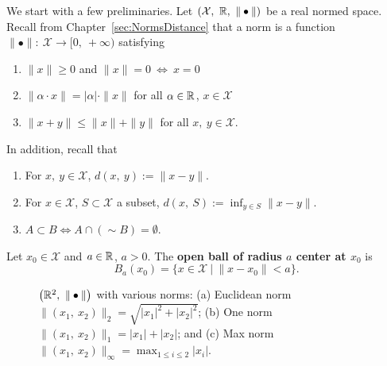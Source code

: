 We start with a few preliminaries. Let $(\mathcal{X},\ \mathbb R,\ \|\bullet\|)$ be a real normed space. Recall from Chapter~\ref{sec:NormsDistance} that a norm is a function $\|\bullet\|:\ \mathcal{X}\to[0,\ +\infty)$ satisfying
    \begin{enumerate}
       \renewcommand{\labelenumi}{(\alph{enumi})}
        \setlength{\itemsep}{.1cm}
        \item $\|x\|\geq 0$ and $\|x\|=0\ \iff\ x=0$
        \item $\|\alpha\cdot x\|=|\alpha|\cdot\|x\|$ for all $\alpha\in\mathbb R$, $x\in\mathcal{X}$
        \item $\|x+y\|\leq\|x\|+\|y\|$ for all $x,\ y\in\mathcal{X}$.
    \end{enumerate}
In addition, recall that
    \begin{enumerate}
       \renewcommand{\labelenumi}{(\alph{enumi})}
        \setlength{\itemsep}{.1cm}
        \setcounter{enumi}{3}
        \item For $x,\ y\in\mathcal{X}$, $d(x,\ y):=\|x-y\|$.
        \item For $x\in \mathcal{X}$, $S\subset\mathcal{X}$ a subset, $d(x,\ S):=\inf_{y\in S}\|x-y\|.$
        \item $ A \subset B  \iff A \cap (\sim B) = \emptyset$.
    \end{enumerate}

\begin{definition}Let $x_0\in \mathcal{X}$ and $a\in\mathbb R$, $a>0$. The \textbf{ open ball of radius $a$ center at $x_0$} is
    \begin{equation*}
        B_a(x_0)=\{x\in\mathcal{X}~|~\|x-x_0\|<a\}.
    \end{equation*}
    
\end{definition} 

\begin{figure}[hbt!]%
    \caption[]{ $\left(\real^2,\ \|\bullet\|\right)$ with various norms: (a) Euclidean norm $\|(x_1,\ x_2)\|_2=\sqrt{|x_1|^2+|x_2|^2 }$; (b) One norm  $\|(x_1,\ x_2)\|_1=|x_1|+|x_2|$; and (c) Max norm $ \|(x_1,\ x_2)\|_\infty=\max_{1\leq i\leq 2}|x_i|$. }
    \label{fig:UnitBalls}
\end{figure} 


